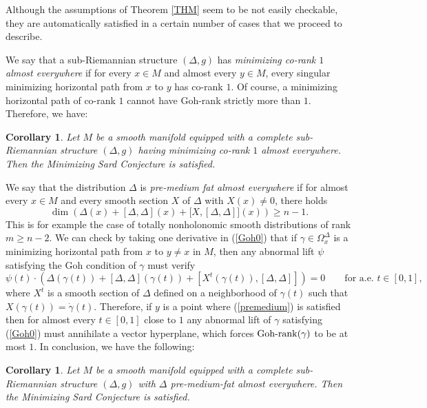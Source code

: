 \documentclass[JEP,XML,SOM,Unicode,NoFloatCountersInSection,published]{cedram}
\DeclareMathOperator{\Gohrank}{Goh\textup{-}rank}
\newtheorem{corollary}[theorem]{Corollary}
\theoremstyle{definition}
\begin{document}
Although the assumptions of Theorem \ref{THM} seem to be not easily checkable, they are automatically satisfied in a certain number of cases that we proceed to describe.

We say that a sub-Riemannian structure $(\Delta,g)$ has {\it minimizing co-rank $1$ almost everywhere} if for every $x\in M$ and almost every $y\in M$, every singular minimizing horizontal path from $x$ to $y$ has co-rank $1$. Of course, a minimizing horizontal path of co-rank $1$ cannot have Goh-rank strictly more than $1$. Therefore, we have:

\begin{corollary}\label{COR1}
Let $M$ be a smooth manifold equipped with a complete sub-Riemannian structure $(\Delta,g)$ having minimizing co-rank $1$ almost everywhere. Then the Minimizing Sard Conjecture is satisfied.
\end{corollary}

We say that the distribution $\Delta$ is {\it pre-medium fat almost everywhere} if for almost every $x\in M$ and every smooth section $X$ of $\Delta$ with $X(x) \neq 0$, there holds
\begin{equation}\label{premedium}
\dim \left(\Delta(x)+ [\Delta,\Delta](x) + \bigl[X,[\Delta,\Delta] \bigr](x)\right) \geq n-1.
\end{equation}
This is for example the case of totally nonholonomic smooth distributions of rank $m\geq n-2$. We can check by taking one derivative in (\ref{Goh0}) that if $\gamma \in \Omega_{x}^{\Delta}$ is a minimizing horizontal path from $x$ to $y\neq x$ in $M$, then any abnormal lift $\psi$ satisfying the Goh condition of $\gamma$ must verify
\[
\psi(t) \cdot \left(\Delta(\gamma(t)) + [\Delta,\Delta](\gamma(t)) + [X^t(\gamma(t)),[\Delta,\Delta]] \right) = 0 \qquad \text{for a.e. } t \in [0,1],
\]
where $X^t$ is a smooth section of $\Delta$ defined on a neighborhood of $\gamma(t)$ such that $X(\gamma(t)) = \dot{\gamma}(t)$. Therefore, if $y$ is a point where (\ref{premedium}) is satisfied then for almost every $t\in [0,1]$ close to $1$ any abnormal lift of $\gamma$ satisfying (\ref{Goh0}) must annihilate a vector hyperplane, which forces $\Gohrank(\gamma)$ to be at most $1$. In conclusion, we have the following:

\begin{corollary}\label{COR2}
Let $M$ be a smooth manifold equipped with a complete sub-Riemannian structure $(\Delta,g)$ with $\Delta$ pre-medium-fat almost everywhere. Then the Minimizing Sard Conjecture is satisfied.
\end{corollary}
\end{document}
